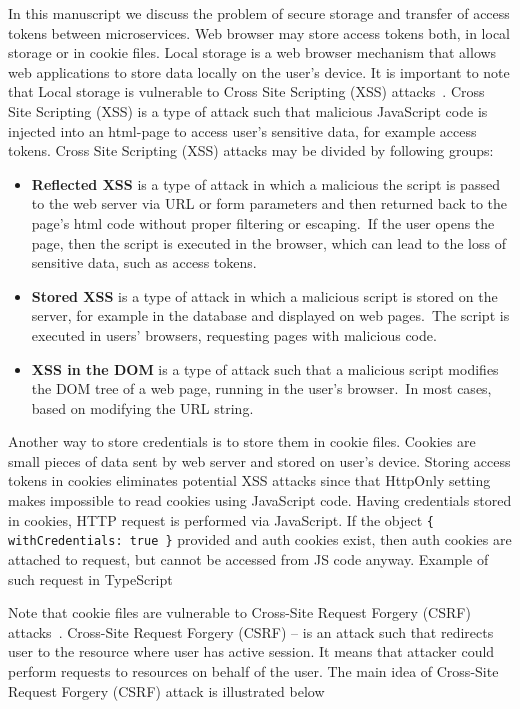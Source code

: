In this manuscript we discuss the problem of secure storage and transfer of access tokens between microservices.
Web browser may store access tokens both, in local storage or in cookie files.
Local storage is a web browser mechanism that allows web applications to store data locally on the user's device.
It is important to note that Local storage is vulnerable to Cross Site Scripting (XSS) attacks~\cite{spett2005cross}.
Cross Site Scripting (XSS) is a type of attack such that malicious JavaScript code is injected into an html-page
to access user's sensitive data, for example access tokens.
Cross Site Scripting (XSS) attacks may be divided by following groups:

\begin{itemize}
    \item \textbf{Reflected XSS} is a type of attack in which a malicious
    the script is passed to the web server via URL or form parameters and then returned back to the page's html code
    without proper filtering or escaping.\ If the user opens the page, then the script is executed
    in the browser, which can lead to the loss of sensitive data, such as access tokens.
    \item \textbf{Stored XSS} is a type of attack in which a malicious script is stored on the server, for example
    in the database and displayed on web pages.\ The script is executed in users' browsers,
    requesting pages with malicious code.
    \item \textbf{XSS in the DOM} is a type of attack such that a malicious script modifies the DOM tree of a web page,
    running in the user's browser.\ In most cases, based on modifying the URL string.
\end{itemize}

Another way to store credentials is to store them in cookie files.
Cookies are small pieces of data sent by web server and stored on user's device.
Storing access tokens in cookies eliminates potential XSS attacks since that HttpOnly setting
makes impossible to read cookies using JavaScript code.
Having credentials stored in cookies, HTTP request is performed via JavaScript.
If the object \texttt{\{ withCredentials: true \}} provided and auth cookies exist, then auth cookies are attached to request,
but cannot be accessed from JS code anyway.
Example of such request in TypeScript



Note that cookie files are vulnerable to Cross-Site Request Forgery (CSRF) attacks~\cite{siddiqui2011cross}.
Cross-Site Request Forgery (CSRF) -- is an attack such that redirects user to the resource where user has active session.
It means that attacker could perform requests to resources on behalf of the user.
The main idea of Cross-Site Request Forgery (CSRF) attack is illustrated below

